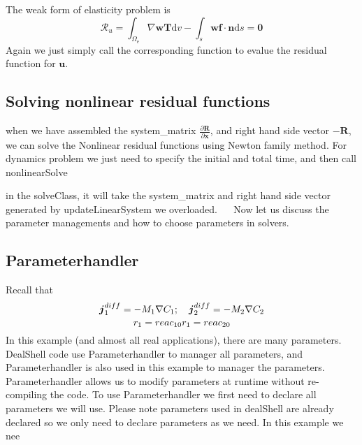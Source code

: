 \begin{DoxyCode}{0}
\end{DoxyCode}
 The weak form of elasticity problem is \[ \mathscr{R}_u=\int_{\Omega_{\text{e}}}\nabla \boldsymbol{w}\boldsymbol{T} \text{d}v- \int_{s}\boldsymbol{w} \boldsymbol{f} \cdot \boldsymbol{n} \text{d}s = \boldsymbol{0} \] Again we just simply call the corresponding function to evalue the residual function for $\boldsymbol{u}$. 
\begin{DoxyCode}{0}
\end{DoxyCode}
\hypertarget{brain_morph_solve}{}\subsection{Solving nonlinear residual functions}\label{brain_morph_solve}
when we have assembled the system\+\_\+matrix $\frac{\partial \boldsymbol{R}}{\partial \boldsymbol{x}} $, and right hand side vector $-\boldsymbol{R}$, we can solve the Nonlinear residual functions using Newton family method. For dynamics problem we just need to specify the initial and total time, and then call {\ttfamily nonlinear\+Solve} 
\begin{DoxyCode}{0}
\DoxyCodeLine{\}}
\end{DoxyCode}
 in the {\ttfamily solve\+Class}, it will take the system\+\_\+matrix and right hand side vector generated by {\ttfamily update\+Linear\+System} we overloaded.~\newline
 ~\newline
 Now let us discuss the parameter managements and how to choose parameters in solvers. \hypertarget{brain_morph_parameter}{}\subsection{Parameterhandler}\label{brain_morph_parameter}
Recall that \[ \boldsymbol{j}_1^{diff}=-M_1\nabla C_\text{1}; \quad \boldsymbol{j}_2^{diff}=-M_2\nabla C_\text{2}\\ \] \[ r_1= reac_{10} \\ r_1= reac_{20} \] In this example (and almost all real applications), there are many parameters. Deal\+Shell code use {\ttfamily Parameterhandler} to manager all parameters, and {\ttfamily Parameterhandler} is also used in this example to manager the parameters. {\ttfamily Parameterhandler} allows us to modify parameters at runtime without re-\/compiling the code. To use {\ttfamily Parameterhandler} we first need to declare all parameters we will use. Please note parameters used in deal\+Shell are already declared so we only need to declare parameters as we need. In this example we nee 
